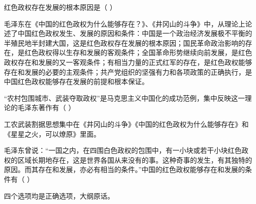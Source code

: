 \question 红色政权存在发展的根本原因是（ ）
\par{}
\begin{solution}毛泽东在《中国的红色政权为什么能够存在？》、《井冈山的斗争》中，从理论上论述了中国红色政权发生、发展的原因和条件：中国是一个政治经济发展极不平衡的半殖民地半封建大国，这是红色政权存在发展的根本原因；国民革命政治影响的存在，是红色政权得以生存和发展的客观条件；全国革命形势继续向前发展，是红色政权存在和发展的又一客观条件；有相当力量的正式红军的存在，是红色政权能够存在和发展的必要的主观条件；共产党组织的坚强有力和各项政策的正确执行，是中国红色政权能够存在发展的前提和根本保证。
\end{solution}
\question ``农村包围城市、武装夺取政权''是马克思主义中国化的成功范例，集中反映这一理论的毛泽东著作有（
）
\par{}
\begin{solution}工农武装割据思想集中在《井冈山的斗争》《中国的红色政权为什么能够存在》和《星星之火，可以燎原》里面。
\end{solution}
\question 毛泽东曾说：``一国之内，在四围白色政权的包围中，有一小块或若干小块红色政权的区域长期地存在，这是世界各国从来没有的事。这种奇事的发生，有其独特的原因。而其存在和发展，亦必有相当的条件。''中国的红色政权能够存在和发展的条件有（
）
\par\twoch{\textcolor{red}{白区政权长期的分裂和战争}}{\textcolor{red}{工农兵群众的发展}}{\textcolor{red}{相当力量的正式红军的存在}}{\textcolor{red}{共产党组织的有力量和政策的不错误}}
\begin{solution}四个选项均是正确选项，大纲原话。
\end{solution}
